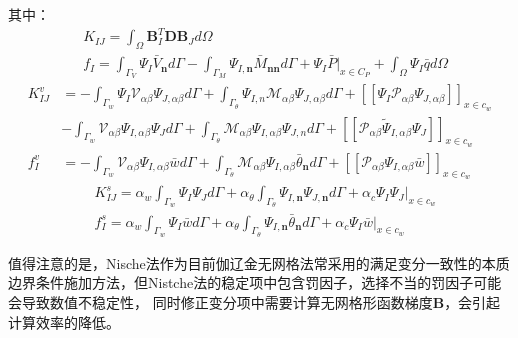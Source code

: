 其中：
\begin{subequations}
\begin{align}
    &K_{I\!J}=\int_{\Omega}\pmb{B}^T_I\pmb{D}\pmb{B}_Jd\Omega\\
    &f_I=\int_{\Gamma_V}\Psi_I\bar{V}_{\pmb{n}}d\Gamma-\int_{\Gamma_M}\Psi_{I,\pmb{n}}\bar{M}_{\pmb{nn}}d\Gamma+\Psi_I\bar{P}\vert_{x\in C_P}+\int_{\Omega}\Psi_I\bar{q}d\Omega
\end{align}
\end{subequations}
\begin{subequations}
\begin{align}
     K^v_{I\!J}&=-\int_{\Gamma_w}\Psi_I\mathcal{V}_{\alpha\beta}\Psi_{J,\alpha\beta}d\Gamma+\int_{\Gamma_{\theta}}\Psi_{I,n}\mathcal{M}_{\alpha\beta}\Psi_{J,\alpha\beta}d\Gamma+[[\Psi_I\mathcal{P}_{\alpha\beta}\Psi_{J,\alpha\beta}]]_{x\in{c_w}}\\
     &-\int_{\Gamma_w}\mathcal{V}_{\alpha\beta}\Psi_{I,\alpha\beta}\Psi_Jd\Gamma+\int_{\Gamma_{\theta}}\mathcal{M}_{\alpha\beta}\Psi_{I,\alpha\beta}\Psi_{J,n}d\Gamma+[[\mathcal{P}_{\alpha\beta}\tilde{\Psi}_{I,\alpha\beta}\Psi_J]]_{x\in{c_w}}\\
     f_{I}^v&=-\int_{\Gamma_w}\mathcal{V}_{\alpha\beta}\Psi_{I,\alpha\beta}\bar{w}d\Gamma+\int_{\Gamma_{\theta}}\mathcal{M}_{\alpha\beta}\Psi_{I,\alpha\beta}\bar{\theta}_{\pmb n}d\Gamma+[[\mathcal{P}_{\alpha\beta}\Psi_{I,\alpha\beta}\bar{w}]]_{x\in{c_w}}
\end{align}
\end{subequations}
\begin{subequations}
\begin{align}
&K^s_{I\!J}=\alpha_w\int_{\Gamma_w}\Psi_I\Psi_Jd\Gamma+\alpha_{\theta}\int_{\Gamma_{\theta}}\Psi_{I,\pmb n}\Psi_{J,\pmb n}d\Gamma+\alpha_c\Psi_I\Psi_J\vert_{x\in c_w}\\
&f^s_I=\alpha_w\int_{\Gamma_w}\Psi_I\bar{w}d\Gamma+\alpha_{\theta}\int_{\Gamma_{\theta}}\Psi_{I,\pmb n}\bar{\theta}_{\pmb n}d\Gamma+\alpha_c\Psi_I\bar{w}\vert_{x\in c_w}
\end{align}
\end{subequations}\par
值得注意的是，Nische法作为目前伽辽金无网格法常采用的满足变分一致性的本质边界条件施加方法，但Nistche法的稳定项中包含罚因子，选择不当的罚因子可能会导致数值不稳定性，
同时修正变分项中需要计算无网格形函数梯度$\pmb{B}$，会引起计算效率的降低。
